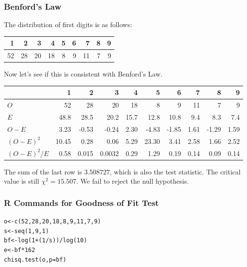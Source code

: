 \documentclass[xcolor=dvipsnames]{beamer}
\begin{document}
\begin{frame}
  \frametitle{Benford's Law}
  The distribution of first digits is as follows:
  \begin{tabular}{|r|r|r|r|r|r|r|r|r|}\hline
   1 & 2 & 3 & 4 & 5 & 6 &  7 & 8 & 9 \\ \hline
   52 & 28 & 20 & 18 & 8 & 9 & 11 & 7 &  9 \\ \hline
  \end{tabular}

\bigskip

  Now let's see if this is consistent with Benford's Law.

\bigskip

\begin{scriptsize}
  \begin{tabular}{|l|r|r|r|r|r|r|r|r|r|}\hline
                 & 1     & 2     & 3     & 4    & 5     & 6     & 7    & 8     & 9    \\ \hline
   $O$           & 52    & 28    & 20    & 18   & 8     & 9     & 11   & 7     & 9    \\ \hline
   $E$           & 48.8  & 28.5  & 20.2  & 15.7 & 12.8  & 10.8  & 9.4  & 8.3   & 7.4  \\ \hline
   $O-E$         & 3.23  & -0.53 & -0.24 & 2.30 & -4.83 & -1.85 & 1.61 & -1.29 & 1.59 \\ \hline
   $(O-E)^{2}$   & 10.45 &  0.28 &  0.06 &  5.29 & 23.30 & 3.41 & 2.58 & 1.66 & 2.52 \\ \hline
   $(O-E)^{2}/E$ & 0.58 & 0.015 & 0.0032 & 0.29 & 1.29 & 0.19 & 0.14 & 0.09 & 0.14 \\ \hline
  \end{tabular}
\end{scriptsize}

\bigskip

The sum of the last row is $3.508727$, which is also the test
statistic. The critical value is still $\chi^{2}=15.507$. We fail
to reject the null hypothesis.
\end{frame}

\begin{frame}[fragile]
  \frametitle{R Commands for Goodness of Fit Test}
\begin{alltt}
o<-c(52,28,20,18,8,9,11,7,9) \newline
s<-seq(1,9,1) \newline
bf<-log(1+(1/s))/log(10) \newline
e<-bf*162 \newline
chisq.test(o,p=bf)
\end{alltt}
\end{frame}
\end{document}
